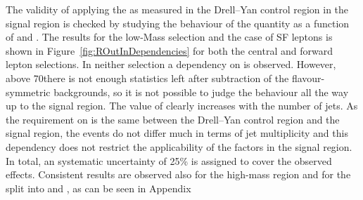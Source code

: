 
The validity of applying the \Routin as measured in the Drell--Yan control region in the signal region is checked by studying the behaviour of the quantity as a function of \MET and \njets. The results for the low-Mass selection and the case of SF leptons is shown in Figure~\ref{fig:ROutInDependencies} for both the central and forward lepton selections. In neither selection a dependency on \MET is observed. However, above 70\GeV there is not enough statistics left after subtraction of the flavour-symmetric backgrounds, so it is not possible to judge the behaviour all the way up to the signal region. The value of \Routin clearly increases with the number of jets. As the requirement on \njets is the same between the Drell--Yan control region and the signal region, the events do not differ much in terms of jet multiplicity and this dependency does not restrict the applicability of the \Routin factors in the signal region. In total, an systematic uncertainty of 25\% is assigned to cover the observed effects. Consistent results are observed also for the high-mass region and for the split into \EE and \MM, as can be seen in Appendix~

